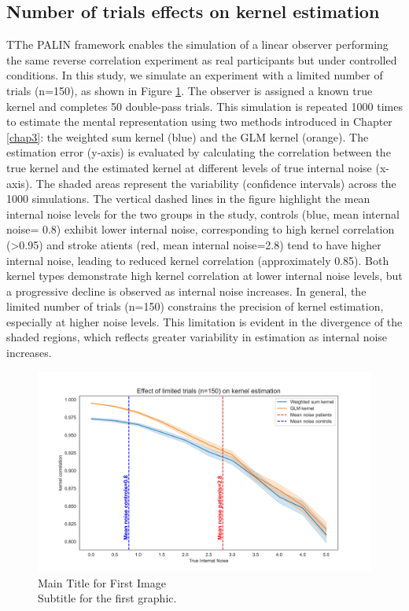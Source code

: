 \subsection{Number of trials effects on kernel estimation}
TThe PALIN framework enables the simulation of a linear observer performing the same reverse correlation experiment as real participants but under controlled conditions. In this study, we simulate an experiment with a limited number of trials (n=150), as shown in Figure \ref{fig:kernel_150}. The observer is assigned a known true kernel and completes 50 double-pass trials. This simulation is repeated 1000 times to estimate the mental representation using two methods introduced in Chapter \ref{chap3}: the weighted sum kernel (blue) and the GLM kernel (orange). The estimation error (y-axis) is evaluated by calculating the correlation between the true kernel and the estimated kernel at different levels of true internal noise (x-axis). The shaded areas represent the variability (confidence intervals) across the 1000 simulations.
The vertical dashed lines in the figure highlight the mean internal noise levels for the two groups in the study, controls (blue, mean internal noise= 0.8) exhibit lower internal noise, corresponding to high kernel correlation (>0.95) and stroke atients (red, mean internal noise=2.8) tend to have higher internal noise, leading to reduced kernel correlation (approximately 0.85). Both kernel types demonstrate high kernel correlation at lower internal noise levels, but a progressive decline is observed as internal noise increases. In general, the limited number of trials (n=150) constrains the precision of kernel estimation, especially at higher noise levels. This limitation is evident in the divergence of the shaded regions, which reflects greater variability in estimation as internal noise increases.


\begin{figure}[H]
    \centering
    \includegraphics[width=15cm]{MainLayout/Images/chapter5/kernel_150.jpg}
    \caption{Main Title for First Image \\ \small Subtitle for the first graphic.}
    \label{fig:kernel_150}
\end{figure}

